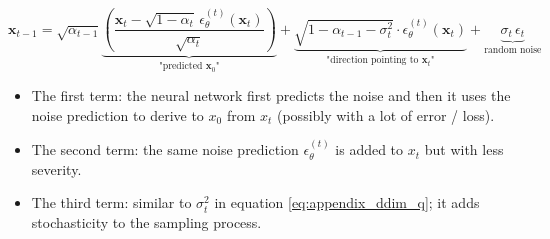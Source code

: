\begin{equation}
\mathbf{x}_{t-1} = \sqrt{\alpha_{t-1}} \underbrace{\left( \frac{\mathbf{x}_t - \sqrt{1 - \alpha_t} \, \epsilon_{\theta}^{(t)}(\mathbf{x}_t)}{\sqrt{\alpha_t}} \right)}_{\text{"predicted } \mathbf{x}_0\text{"}} + \underbrace{\sqrt{1 - \alpha_{t-1} - \sigma_t^2} \cdot \epsilon_{\theta}^{(t)}(\mathbf{x}_t)}_{\text{"direction pointing to } \mathbf{x}_t\text{"}} + \underbrace{\sigma_t \, \epsilon_t}_{\text{random noise}}
\end{equation}

\begin{itemize}
    \item The first term: the neural network first predicts the noise and then it uses the noise prediction to derive to $x_0$ from $x_t$ (possibly with a lot of error / loss).
    \item The second term: the same noise prediction $\epsilon_{\theta}^{(t)}$ is added to $x_t$ but with less severity.
    \item The third term: similar to $\sigma_t^2$ in equation \ref{eq:appendix_ddim_q}; it adds stochasticity to the sampling process.
\end{itemize}











